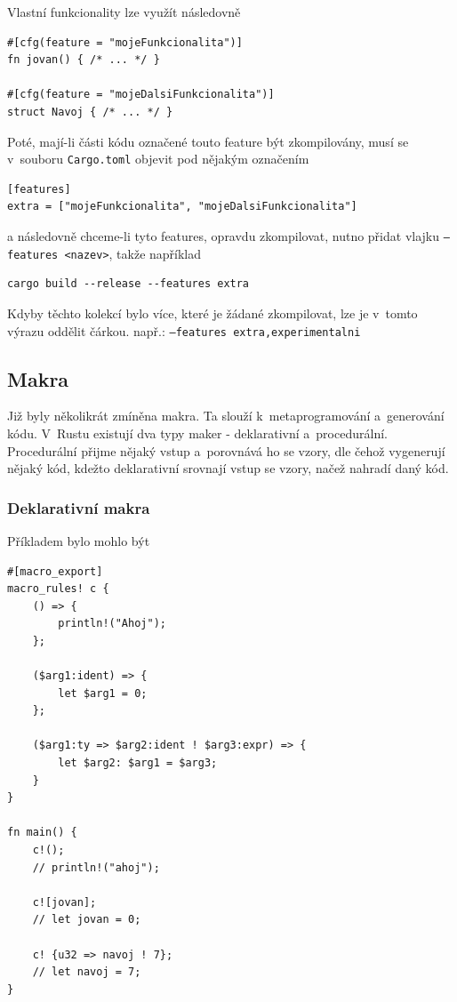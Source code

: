\documentclass[a4paper, 12pt, twoside]{article} %
\begin{document}
			Vlastní funkcionality lze využít následovně
			\begin{verbatim}
#[cfg(feature = "mojeFunkcionalita")]
fn jovan() { /* ... */ }

#[cfg(feature = "mojeDalsiFunkcionalita")]
struct Navoj { /* ... */ }
			\end{verbatim}
			
			Poté, mají-li části kódu označené touto feature být zkompilovány, musí se v~souboru \texttt{Cargo.toml} objevit pod nějakým označením
			\begin{verbatim}
[features]
extra = ["mojeFunkcionalita", "mojeDalsiFunkcionalita"]
			\end{verbatim}
			
			a následovně chceme-li tyto features, opravdu zkompilovat, nutno přidat vlajku \texttt{--features <nazev>}, takže například
			\begin{verbatim}
cargo build --release --features extra 
			\end{verbatim}
			
			Kdyby těchto kolekcí bylo více, které je žádané zkompilovat, lze je v~tomto výrazu oddělit čárkou. např.: \texttt{--features extra,experimentalni} 


	\subsection{Makra}
		Již byly několikrát zmíněna makra. Ta slouží k~metaprogramování a~generování kódu. V~Rustu existují dva typy maker - deklarativní a~procedurální. Procedurální přijme nějaký vstup a~porovnává ho se vzory, dle čehož vygenerují nějaký kód, kdežto deklarativní srovnají vstup se vzory, načež nahradí daný kód.


		\subsubsection*{Deklarativní makra}
			Příkladem bylo mohlo být
			\begin{verbatim}
#[macro_export]
macro_rules! c {
	() => {
		println!("Ahoj");
	};

	($arg1:ident) => {
		let $arg1 = 0;
	};
	
	($arg1:ty => $arg2:ident ! $arg3:expr) => {
		let $arg2: $arg1 = $arg3;
	}
}

fn main() {
	c!();
	// println!("ahoj");
	
	c![jovan];
	// let jovan = 0;
	
	c! {u32 => navoj ! 7};
	// let navoj = 7;
}
			\end{verbatim}
\end{document}
